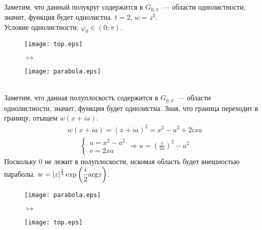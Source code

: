 \\
Заметим, что данный полукруг содержится в $G_{0, \pi}$~--- области
однолистности, значит, функция будет однолистна.
\Example
$t = 2$, $w = z^2$.
\\
Условие однолистности: $\varphi_0 \in (0; \pi)$.
\begin{figure}[h!]
    \begin{minipage}[c]{0.45\textwidth}
        \centering
        \texttt{[image: top.eps]}
    \end{minipage}
    \begin{minipage}[c]{0.1\textwidth}
        \centering
        \LARGE{$\mapsto$}
    \end{minipage}
    \begin{minipage}[c]{0.45\textwidth}
        \centering
        \texttt{[image: parabola.eps]}
    \end{minipage}
    \label{fig:24.2}
\end{figure}
\\
Заметим, что данная полуплоскость содержится в $G_{0, \pi}$~--- области
однолистности, значит, функция будет однолистна. Зная, что граница переходит в
границу, отыщем $w(x+ia)$.
\begin{align*}
  & w(x+ia) = (x+ia)^2 = x^2 - a^2 + 2ixa
\end{align*}
\begin{align*}
  & \begin{cases}
      u = x^2 - a^2 \\
      v = 2xa
  \end{cases} \Rightarrow u  = \left( \frac{v}{2a} \right)^2 - a^2
\end{align*}
Поскольку $0$ не лежит в полуплоскости, искомая область будет внешностью
параболы.
\Example
$w = \left| z \right|^{\frac{1}{2}}\exp \left(\displaystyle \frac{i}{2}\mathrm{arg} z\right)$.
\begin{figure}[h!]
    \begin{minipage}[c]{0.45\textwidth}
        \centering
        \texttt{[image: parabola.eps]}
    \end{minipage}
    \begin{minipage}[c]{0.1\textwidth}
        \centering
        \LARGE{$\mapsto$}
    \end{minipage}
    \begin{minipage}[c]{0.45\textwidth}
        \centering
        \texttt{[image: top.eps]}
    \end{minipage}
    \label{fig:24.3}
\end{figure}
